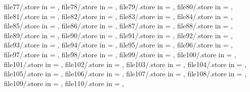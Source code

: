{    file77/.store in         = \analogPlotFileCZ,
    file78/.store in         = \analogPlotFileDA,
    file79/.store in         = \analogPlotFileDB,
    file80/.store in         = \analogPlotFileDC,
    file81/.store in         = \analogPlotFileDD,
    file82/.store in         = \analogPlotFileDE,
    file83/.store in         = \analogPlotFileDF,
    file84/.store in         = \analogPlotFileDG,
    file85/.store in         = \analogPlotFileDH,
    file86/.store in         = \analogPlotFileDI,
    file87/.store in         = \analogPlotFileDJ,
    file88/.store in         = \analogPlotFileDK,
    file89/.store in         = \analogPlotFileDL,
    file90/.store in         = \analogPlotFileDM,
    file91/.store in         = \analogPlotFileDN,
    file92/.store in         = \analogPlotFileDO,
    file93/.store in         = \analogPlotFileDP,
    file94/.store in         = \analogPlotFileDQ,
    file95/.store in         = \analogPlotFileDR,
    file96/.store in         = \analogPlotFileDS,
    file97/.store in         = \analogPlotFileDT,
    file98/.store in         = \analogPlotFileDU,
    file99/.store in         = \analogPlotFileDV,
    file100/.store in        = \analogPlotFileDW,
    file101/.store in        = \analogPlotFileDX,
    file102/.store in        = \analogPlotFileDY,
    file103/.store in        = \analogPlotFileDZ,
    file104/.store in        = \analogPlotFileEA,
    file105/.store in        = \analogPlotFileEB,
    file106/.store in        = \analogPlotFileEC,
    file107/.store in        = \analogPlotFileED,
    file108/.store in        = \analogPlotFileEE,
    file109/.store in        = \analogPlotFileEF,
    file110/.store in        = \analogPlotFileEG,
}

